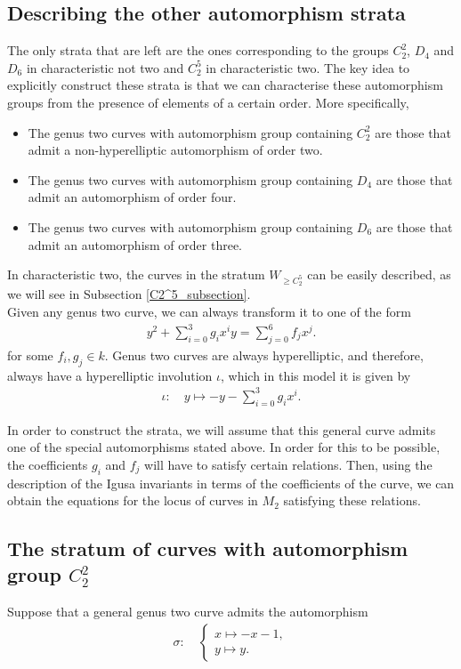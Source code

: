 \documentclass{amsart}
\numberwithin{equation}{section}
\theoremstyle{definition}
\theoremstyle{remark}
\begin{document}
\subsection{Describing the other automorphism strata}
The only strata that are left are the ones corresponding to the groups $C_2^2$, $D_4$ and $D_6$ in characteristic not two and $C_2^5$ in characteristic two.
The key idea to explicitly construct these strata is that we can characterise these automorphism groups from the presence of elements of a certain order. More specifically,
\begin{itemize}
    \item The genus two curves with automorphism group containing $C_2^2$ are those that admit a non-hyperelliptic automorphism of order two.
    \item  The genus two curves with automorphism group containing $D_4$ are those that admit an automorphism of order four.
    \item The genus two curves with automorphism group containing $D_6$ are those that admit an automorphism of order three.\\
\end{itemize}
In characteristic two, the curves in the stratum $W_{\geq C_2^5}$ can be easily described, as we will see in Subsection \ref{C2^5_subsection}.\\

Given any genus two curve, we can always transform it to one of the form
\begin{align*}
y^2+\sum_{i=0}^3g_ix^i y=\sum_{j=0}^6f_j x^j.
\end{align*}
for some $f_i,g_j\in k$. Genus two curves are always hyperelliptic, and therefore, always have a hyperelliptic involution $\iota$, which in this model it is given by
\begin{align*}
\iota\colon\quad y\mapsto -y-\sum_{i=0}^3g_ix^i.
\end{align*}


In order to construct the strata, we will assume that this general curve admits one of the special automorphisms stated above. In order for this to be possible, the coefficients $g_i$ and $f_j$ will have to satisfy certain relations. Then, using the description of the Igusa invariants in terms of the coefficients of the curve, we can obtain the equations for the locus of curves in $M_2$ satisfying these relations.\\


\subsection{The stratum of curves with automorphism group \texorpdfstring{$C_2^2$}{C2²}} \label{C22_section}
Suppose that a general genus two curve admits the automorphism
\begin{align} \label{order2inV4_eq}
\sigma\colon\quad\begin{cases}
    x\mapsto -x-1,\\
    y\mapsto y.
    \end{cases}
\end{align}
\end{document}
